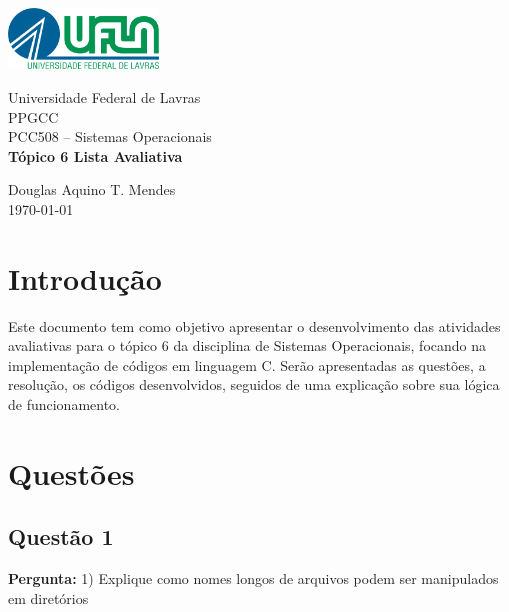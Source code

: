 \documentclass{article}
\begin{document}
\begin{titlepage}
    \centering
    \includegraphics[width=0.3\textwidth]{../../Topic1/Avaliativo/Imagens/Logo UFLA - Colorida chapada.png}

    \vspace*{2cm} %
    \Large
    Universidade Federal de Lavras\\
    PPGCC\\
    PCC508 – Sistemas Operacionais\\
    
    \vspace{2cm} %
    \huge %
    \textbf{Tópico 6 Lista Avaliativa}
    
    \vfill %
    
    \large
    Douglas Aquino T. Mendes\\
    \today %
\end{titlepage}

\tableofcontents
\newpage

\section{Introdução}
Este documento tem como objetivo apresentar o desenvolvimento das atividades avaliativas para o tópico 6 da disciplina de Sistemas Operacionais, focando na implementação de códigos em linguagem C. Serão apresentadas as questões, a resolução, os códigos desenvolvidos, seguidos de uma explicação sobre sua lógica de funcionamento.

\section{Questões}

\subsection{Questão 1}
\textbf{Pergunta:} 1) Explique como nomes longos de arquivos podem ser manipulados em diretórios\newline
\end{document}
